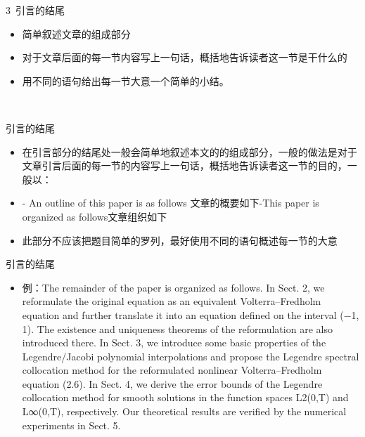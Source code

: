 \documentclass[13pt]{ctexbeamer}
\begin{document}
\begin{frame}{3~引言的结尾}
    \begin{itemize}

        \item 简单叙述文章的组成部分

        \item 对于文章后面的每一节内容写上一句话，概括地告诉读者这一节是干什么的
        \item 用不同的语句给出每一节大意一个简单的小结。
    \end{itemize}
\end{frame}
\\


\begin{frame}{引言的结尾}

\begin{itemize}
    \item
    在引言部分的结尾处一般会简单地叙述本文的的组成部分，一般的做法是对于文章引言后面的每一节的内容写上一句话，概括地告诉读者这一节的目的，一般以：
    \item
    - An outline of this paper is as follows \newline 文章的概要如下\newline-This paper is organized as follows\newline 文章组织如下
    \item
    此部分不应该把题目简单的罗列，最好使用不同的语句概述每一节的大意
\end{itemize}
\end{frame}

\begin{frame}{引言的结尾}

\begin{itemize}
    \item
    例：The remainder of the paper is organized as follows. In Sect. 2, we reformulate the original equation as an equivalent Volterra–Fredholm equation and further translate it into an equation defined on the interval (−1, 1). The existence and uniqueness theorems of the reformulation are also introduced there. In Sect. 3, we introduce some basic properties of the Legendre/Jacobi polynomial interpolations and propose the Legendre spectral collocation method for the reformulated nonlinear Volterra–Fredholm equation (2.6). In Sect. 4, we derive the error bounds of the Legendre collocation method for smooth solutions in the function spaces L2(0,T) and L∞(0,T), respectively. Our theoretical results are verified by the numerical experiments in Sect. 5.

\end{itemize}
\end{frame}
\end{document}
